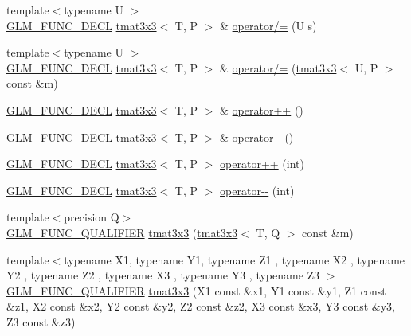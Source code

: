 \begin{DoxyCompactItemize}
{\footnotesize template$<$typename U $>$ }\\\hyperlink{setup_8hpp_ab2d052de21a70539923e9bcbf6e83a51}{G\+L\+M\+\_\+\+F\+U\+N\+C\+\_\+\+D\+E\+CL} \hyperlink{structglm_1_1detail_1_1tmat3x3}{tmat3x3}$<$ T, P $>$ \& \hyperlink{structglm_1_1detail_1_1tmat3x3_afb56c9bce7eef169c698fe459a91c402}{operator/=} (U s)
\item 
{\footnotesize template$<$typename U $>$ }\\\hyperlink{setup_8hpp_ab2d052de21a70539923e9bcbf6e83a51}{G\+L\+M\+\_\+\+F\+U\+N\+C\+\_\+\+D\+E\+CL} \hyperlink{structglm_1_1detail_1_1tmat3x3}{tmat3x3}$<$ T, P $>$ \& \hyperlink{structglm_1_1detail_1_1tmat3x3_a78341f4a3d5353411c69f40e0b9b9560}{operator/=} (\hyperlink{structglm_1_1detail_1_1tmat3x3}{tmat3x3}$<$ U, P $>$ const \&m)
\item 
\hyperlink{setup_8hpp_ab2d052de21a70539923e9bcbf6e83a51}{G\+L\+M\+\_\+\+F\+U\+N\+C\+\_\+\+D\+E\+CL} \hyperlink{structglm_1_1detail_1_1tmat3x3}{tmat3x3}$<$ T, P $>$ \& \hyperlink{structglm_1_1detail_1_1tmat3x3_aba962e910e7a5e3de57b14c4215ec471}{operator++} ()
\item 
\hyperlink{setup_8hpp_ab2d052de21a70539923e9bcbf6e83a51}{G\+L\+M\+\_\+\+F\+U\+N\+C\+\_\+\+D\+E\+CL} \hyperlink{structglm_1_1detail_1_1tmat3x3}{tmat3x3}$<$ T, P $>$ \& \hyperlink{structglm_1_1detail_1_1tmat3x3_a00ca964c42c36a5472103aa3a9b375fc}{operator-\/-\/} ()
\item 
\hyperlink{setup_8hpp_ab2d052de21a70539923e9bcbf6e83a51}{G\+L\+M\+\_\+\+F\+U\+N\+C\+\_\+\+D\+E\+CL} \hyperlink{structglm_1_1detail_1_1tmat3x3}{tmat3x3}$<$ T, P $>$ \hyperlink{structglm_1_1detail_1_1tmat3x3_a42b606493a76f7246e3c4b6a0e10b064}{operator++} (int)
\item 
\hyperlink{setup_8hpp_ab2d052de21a70539923e9bcbf6e83a51}{G\+L\+M\+\_\+\+F\+U\+N\+C\+\_\+\+D\+E\+CL} \hyperlink{structglm_1_1detail_1_1tmat3x3}{tmat3x3}$<$ T, P $>$ \hyperlink{structglm_1_1detail_1_1tmat3x3_a9a9c2ddae87b15a9a7d7000dcd41e27a}{operator-\/-\/} (int)
\item 
{\footnotesize template$<$precision Q$>$ }\\\hyperlink{setup_8hpp_a33fdea6f91c5f834105f7415e2a64407}{G\+L\+M\+\_\+\+F\+U\+N\+C\+\_\+\+Q\+U\+A\+L\+I\+F\+I\+ER} \hyperlink{structglm_1_1detail_1_1tmat3x3_a2b14034fffb8d3dd7f1d6d24131f7510}{tmat3x3} (\hyperlink{structglm_1_1detail_1_1tmat3x3}{tmat3x3}$<$ T, Q $>$ const \&m)
\item 
{\footnotesize template$<$typename X1, typename Y1, typename Z1 , typename X2 , typename Y2 , typename Z2 , typename X3 , typename Y3 , typename Z3 $>$ }\\\hyperlink{setup_8hpp_a33fdea6f91c5f834105f7415e2a64407}{G\+L\+M\+\_\+\+F\+U\+N\+C\+\_\+\+Q\+U\+A\+L\+I\+F\+I\+ER} \hyperlink{structglm_1_1detail_1_1tmat3x3_a6bc248bf277f1e4c97480b964301a9e2}{tmat3x3} (X1 const \&x1, Y1 const \&y1, Z1 const \&z1, X2 const \&x2, Y2 const \&y2, Z2 const \&z2, X3 const \&x3, Y3 const \&y3, Z3 const \&z3)

\end{DoxyCompactItemize}
